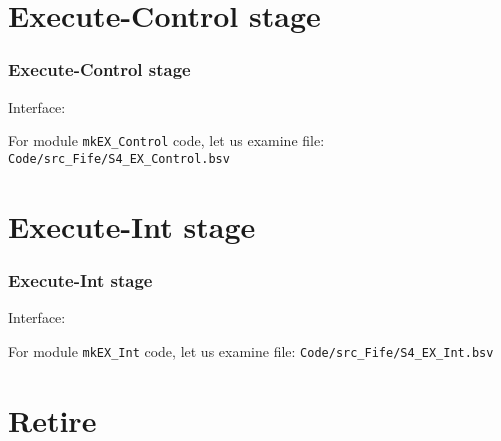 
\section{Execute-Control stage}


\begin{frame}[fragile]
\frametitle{Execute-Control stage}

\footnotesize

Interface: \hmmmm
\begin{minipage}{0.725\textwidth}
\end{minipage}

\vspace{5ex}

For module {\tt mkEX\_Control} code, let us examine file: {\tt Code/src\_Fife/S4\_EX\_Control.bsv}

\end{frame}


\section{Execute-Int stage}


\begin{frame}[fragile]
\frametitle{Execute-Int stage}

\footnotesize

Interface: \hmmmm
\begin{minipage}{0.725\textwidth}
\end{minipage}

\vspace{5ex}

For module {\tt mkEX\_Int} code, let us examine file: {\tt Code/src\_Fife/S4\_EX\_Int.bsv}

\end{frame}


\section{Retire}

